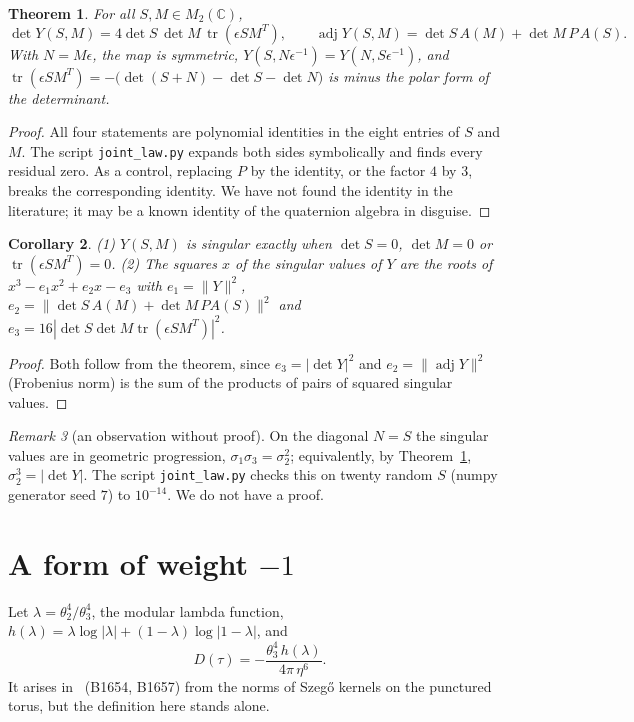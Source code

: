 \documentclass[11pt]{article}
\newtheorem{theorem}{Theorem}
\newtheorem{corollary}[theorem]{Corollary}
\theoremstyle{remark}
\newtheorem{remark}[theorem]{Remark}
\newcommand{\C}{\mathbb{C}}
\newcommand{\tr}{\operatorname{tr}}
\newcommand{\adj}{\operatorname{adj}}
\begin{document}
\begin{theorem}\label{thm:det}
For all $S,M\in M_2(\C)$,
\[
  \det Y(S,M)=4\det S\,\det M\,\tr(\epsilon SM^T),\qquad \adj Y(S,M)=\det S\,A(M)+\det M\,P\,A(S).
\]
With $N=M\epsilon$, the map is symmetric, $Y(S,N\epsilon^{-1})=Y(N,S\epsilon^{-1})$, and
$\tr(\epsilon SM^T)=-\bigl(\det(S+N)-\det S-\det N\bigr)$ is minus the polar form of the determinant.
\end{theorem}
\begin{proof}
All four statements are polynomial identities in the eight entries of $S$ and $M$. The script \texttt{joint\_law.py} expands
both sides symbolically and finds every residual zero. As a control, replacing $P$ by the identity, or the factor $4$ by
$3$, breaks the corresponding identity. We have not found the identity in the literature; it may be a known identity of
the quaternion algebra in disguise.
\end{proof}

\begin{corollary}\label{cor:det}
(1) $Y(S,M)$ is singular exactly when $\det S=0$, $\det M=0$ or $\tr(\epsilon SM^T)=0$.
(2) The squares $x$ of the singular values of $Y$ are the roots of $x^3-e_1x^2+e_2x-e_3$ with $e_1=\|Y\|^2$,
$e_2=\|\det S\,A(M)+\det M\,PA(S)\|^2$ and $e_3=16|\det S\det M\tr(\epsilon SM^T)|^2$.
\end{corollary}
\begin{proof}
Both follow from the theorem, since $e_3=|\det Y|^2$ and $e_2=\|\adj Y\|^2$ (Frobenius norm) is the sum of the products of
pairs of squared singular values.
\end{proof}

\begin{remark}[an observation without proof]
On the diagonal $N=S$ the singular values are in geometric progression, $\sigma_1\sigma_3=\sigma_2^2$; equivalently, by
Theorem~\ref{thm:det}, $\sigma_2^3=|\det Y|$. The script \texttt{joint\_law.py} checks this on twenty random $S$ (numpy
generator seed $7$) to $10^{-14}$. We do not have a proof.
\end{remark}

\section{A form of weight $-1$}\label{sec:D}

Let $\lambda=\theta_2^4/\theta_3^4$, the modular lambda function, $h(\lambda)=\lambda\log|\lambda|+(1-\lambda)\log|1-\lambda|$, and
\[
  D(\tau)=-\frac{\theta_3^4\,h(\lambda)}{4\pi\,\eta^6}.
\]
It arises in~\cite{OriginAxiomRepo} (B1654, B1657) from the norms of Szeg\H{o} kernels on the punctured torus, but the
definition here stands alone.
\end{document}
